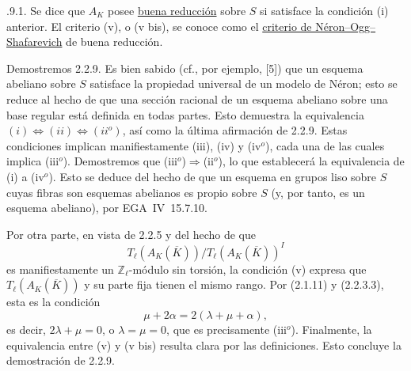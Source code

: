 \medskip
{}.9.1. Se dice que $A_K$ posee \underline{buena reducción} sobre $S$
si satisface la condición (i) anterior. El criterio (v), o (v bis), se
conoce como el \underline{criterio de Néron--Ogg--Shafarevich} de buena
reducción.

Demostremos 2.2.9. Es bien sabido (cf., por ejemplo, [5]) que un esquema
abeliano sobre $S$ satisface la propiedad universal de un modelo de
Néron; esto se reduce al hecho de que una sección racional de un esquema
abeliano sobre una base regular está definida en todas partes. Esto
demuestra la equivalencia
$(i)\Longleftrightarrow(ii)\Longleftrightarrow(ii^o)$, así como la última
afirmación de 2.2.9. Estas condiciones implican manifiestamente (iii),
(iv) y (iv$^o$), cada una de las cuales implica (iii$^o$). Demostremos
que (iii$^o$)$\Longrightarrow$(ii$^o$), lo que establecerá la
equivalencia de (i) a (iv$^o$). Esto se deduce del hecho de que un
esquema en grupos liso sobre $S$ cuyas fibras son esquemas abelianos es
propio sobre $S$ (y, por tanto, es un esquema abeliano), por
EGA~IV~15.7.10.

Por otra parte, en vista de 2.2.5 y del hecho de que
\[
 T_\ell(A_K(\overline K))/T_\ell(A_K(\overline K))^I
\]
es manifiestamente un $\mathbb Z_\ell$-módulo sin torsión, la condición
(v) expresa que $T_\ell(A_K(\overline K))$ y su parte fija tienen el
mismo rango. Por (2.1.11) y (2.2.3.3), esta es la condición
\[
 \mu+2\alpha=2(\lambda+\mu+\alpha),
\]
es decir, $2\lambda+\mu=0$, o $\lambda=\mu=0$, que es precisamente
(iii$^o$). Finalmente, la equivalencia entre (v) y (v bis) resulta
clara por las definiciones. Esto concluye la demostración de 2.2.9.

